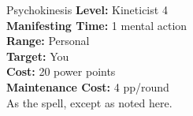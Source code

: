 {Psychokinesis}
{
	\textbf{Level:}
	Kineticist 4\\
	\textbf{Manifesting Time:}
	1 mental action\\
	\textbf{Range:}
	Personal\\
	\textbf{Target:}
	You\\
	\textbf{Cost:}
	20 power points\\
	\textbf{Maintenance Cost:}
	4 pp/round\\
}
{
	As the  spell, except as noted here.
}
